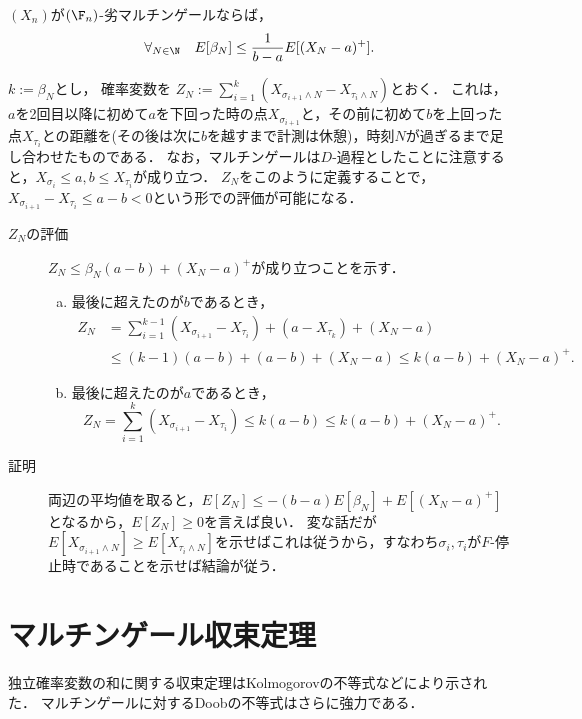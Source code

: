 \documentclass[uplatex,dvipdfmx]{jsreport}
\begin{document}
\begin{theorem}
    $(X_n)$が$(\F_n)$-劣マルチンゲールならば，
    \[\forall_{N\in\N}\quad E[\beta_N]\le\frac{1}{b-a}E[(X_N-a)^+].\]
\end{theorem}
\begin{Proof}
    $k:=\beta_N$とし，
    確率変数を
    $Z_N:=\sum^k_{i=1}(X_{\sigma_{i+1}\land N}-X_{\tau_i\land N})$とおく．
    これは，$a$を2回目以降に初めて$a$を下回った時の点$X_{\sigma_{i+1}}$と，その前に初めて$b$を上回った点$X_{\tau_i}$との距離を(その後は次に$b$を越すまで計測は休憩)，時刻$N$が過ぎるまで足し合わせたものである．
    なお，マルチンゲールは$D$-過程としたことに注意すると，$X_{\sigma_i}\le a,b\le X_{\tau_i}$が成り立つ．
    $Z_N$をこのように定義することで，$X_{\sigma_{i+1}}-X_{\tau_i}\le a-b<0$という形での評価が可能になる．
    \begin{description}
        \item[$Z_N$の評価] $Z_N\le\beta_N(a-b)+(X_N-a)^+$が成り立つことを示す．
        \begin{enumerate}[(a)]
            \item 最後に超えたのが$b$であるとき，
            \begin{align*}
                Z_N&=\sum^{k-1}_{i=1}(X_{\sigma_{i+1}}-X_{\tau_i})+(a-X_{\tau_k})+(X_N-a)\\
                &\le(k-1)(a-b)+(a-b)+(X_N-a)\le k(a-b)+(X_N-a)^+.
            \end{align*}
            \item 最後に超えたのが$a$であるとき，
            \[Z_N=\sum^k_{i=1}(X_{\sigma_{i+1}}-X_{\tau_i})\le k(a-b)\le k(a-b)+(X_N-a)^+.\]
        \end{enumerate}
        \item[証明] 両辺の平均値を取ると，$E[Z_N]\le-(b-a)E[\beta_N]+E[(X_N-a)^+]$となるから，$E[Z_N]\ge0$を言えば良い．
        変な話だが$E[X_{\sigma_{i+1}\land N}]\ge E[X_{\tau_i\land N}]$を示せばこれは従うから，すなわち$\sigma_i,\tau_i$が$F$-停止時であることを示せば結論が従う．

    \end{description}
\end{Proof}

\section{マルチンゲール収束定理}

\begin{tcolorbox}[colframe=ForestGreen, colback=ForestGreen!10!white,breakable,colbacktitle=ForestGreen!40!white,coltitle=black,fonttitle=\bfseries\sffamily,
title=]
    独立確率変数の和に関する収束定理はKolmogorovの不等式などにより示された．
    マルチンゲールに対するDoobの不等式はさらに強力である．
\end{tcolorbox}
\end{document}
